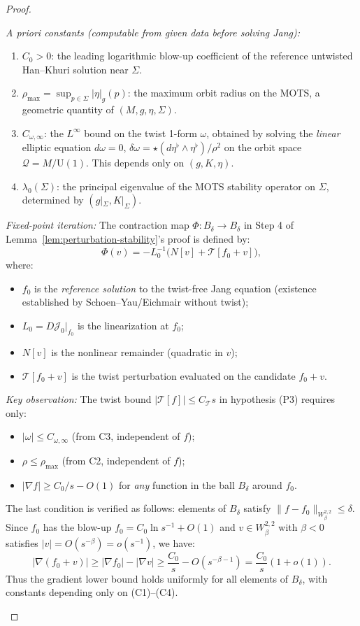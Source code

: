 \begin{proof}
\begin{lemma}
\textit{A priori constants (computable from given data before solving Jang):}
\begin{enumerate}
    \item[(C1)] $C_0 > 0$: the leading logarithmic blow-up coefficient of the reference untwisted Han--Khuri solution near $\Sigma$.
    \item[(C2)] $\rho_{\max} = \sup_{p \in \Sigma} |\eta|_g(p)$: the maximum orbit radius on the MOTS, a geometric quantity of $(M, g, \eta, \Sigma)$.
    \item[(C3)] $C_{\omega,\infty}$: the $L^\infty$ bound on the twist 1-form $\omega$, obtained by solving the \emph{linear} elliptic equation $d\omega = 0$, $\delta\omega = \star(d\eta^\flat \wedge \eta^\flat)/\rho^2$ on the orbit space $\mathcal{Q} = M/\mathrm{U}(1)$. This depends only on $(g, K, \eta)$.
    \item[(C4)] $\lambda_0(\Sigma)$: the principal eigenvalue of the MOTS stability operator on $\Sigma$, determined by $(g|_\Sigma, K|_\Sigma)$.
\end{enumerate}

\textit{Fixed-point iteration:} The contraction map $\Phi: B_\delta \to B_\delta$ in Step 4 of Lemma~\ref{lem:perturbation-stability}'s proof is defined by:
\[
\Phi(v) = -L_0^{-1}\bigl(N[v] + \mathcal{T}[f_0 + v]\bigr),
\]
where:
\begin{itemize}
    \item $f_0$ is the \emph{reference solution} to the twist-free Jang equation (existence established by Schoen--Yau/Eichmair without twist);
    \item $L_0 = D\mathcal{J}_0|_{f_0}$ is the linearization at $f_0$;
    \item $N[v]$ is the nonlinear remainder (quadratic in $v$);
    \item $\mathcal{T}[f_0 + v]$ is the twist perturbation evaluated on the candidate $f_0 + v$.
\end{itemize}

\textit{Key observation:} The twist bound $|\mathcal{T}[f]| \leq C_\mathcal{T} s$ in hypothesis (P3) requires only:
\begin{itemize}
    \item $|\omega| \leq C_{\omega,\infty}$ (from C3, independent of $f$);
    \item $\rho \leq \rho_{\max}$ (from C2, independent of $f$);
    \item $|\nabla f| \geq C_0/s - O(1)$ for \emph{any} function in the ball $B_\delta$ around $f_0$.
\end{itemize}
The last condition is verified as follows: elements of $B_\delta$ satisfy $\|f - f_0\|_{W^{2,2}_\beta} \leq \delta$. Since $f_0$ has the blow-up $f_0 = C_0 \ln s^{-1} + O(1)$ and $v \in W^{2,2}_\beta$ with $\beta < 0$ satisfies $|v| = O(s^{-\beta}) = o(s^{-1})$, we have:
\[
|\nabla(f_0 + v)| \geq |\nabla f_0| - |\nabla v| \geq \frac{C_0}{s} - O(s^{-\beta-1}) = \frac{C_0}{s}(1 + o(1)).
\]
Thus the gradient lower bound holds uniformly for all elements of $B_\delta$, with constants depending only on (C1)--(C4).


\end{lemma}
\end{proof}
